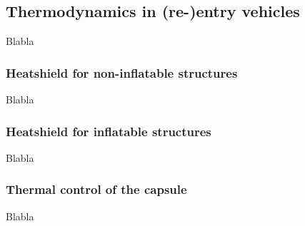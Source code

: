 \subsection{Thermodynamics in (re-)entry vehicles}\label{sec:thermo}
Blabla

\subsubsection{Heatshield for non-inflatable structures}
Blabla

\subsubsection{Heatshield for inflatable structures}
Blabla

\subsubsection{Thermal control of the capsule}
Blabla




